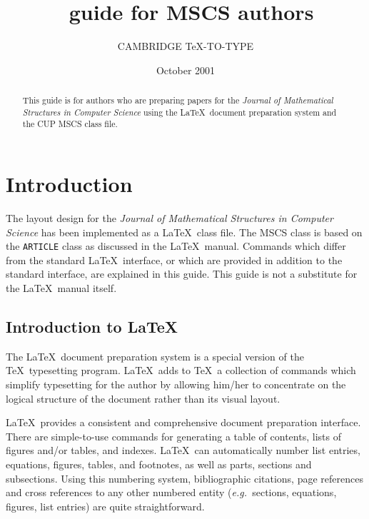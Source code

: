 \documentclass{mscs}
\title[Mathematical Structures in Computer Science]
  {\LaTeXe\ guide for MSCS authors}
\author[\LaTeXe\ guide]
  {C\ls A\ls M\ls B\ls R\ls I\ls D\ls G\ls E\ns
   \TeX\ls -\ls T\ls O\ls -\ls T\ls Y\ls P\ls E}
\date{October 2001}
\newcommand\eg{\textit{e.g.\ }}
\begin{document}
\label{firstpage}
\maketitle

\begin{abstract}
This guide is for authors who are preparing papers for the
\emph{Journal of Mathematical Structures in Computer Science}
using the \LaTeX\ document preparation system and the CUP MSCS class file.
\end{abstract}

\tableofcontents

\ifprodtf \newpage \else \vspace*{-1\baselineskip}\fi

\section{Introduction}

The layout design for the \emph{Journal of Mathematical Structures
in Computer Science} has been implemented as a \LaTeX\ class file.
The MSCS class is based on the \verb"ARTICLE" class as discussed in
the \LaTeX\ manual.
Commands which differ from the standard \LaTeX\ interface, or which are
provided in addition to the standard interface, are explained in this
guide. This guide is not a substitute for the \LaTeX\ manual itself.

\ifprodtf \else \newpage\fi

\subsection{Introduction to \LaTeX}

The \LaTeX\ document preparation system is a special version of the
\TeX\ typesetting program.
\LaTeX\ adds to \TeX\ a collection of commands which simplify typesetting for
the author by allowing him/her to concentrate on the logical structure of the
document rather than its visual layout.

\LaTeX\ provides a consistent and comprehensive document preparation
interface. There are simple-to-use commands for generating a table of
contents, lists of figures and/or tables, and indexes.
\LaTeX\ can automatically number list entries, equations, figures,
tables, and footnotes, as well as parts, sections and subsections.
Using this numbering system, bibliographic citations, page references and
cross references to any other numbered entity (\eg sections, equations,
figures, list entries) are quite straightforward.
\end{document}
